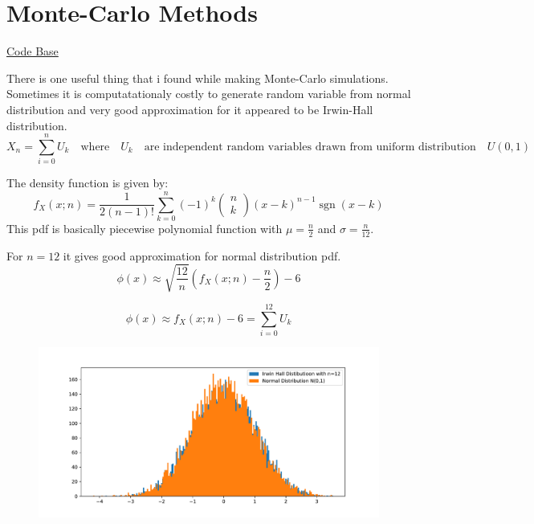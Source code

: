 \chapter{Monte-Carlo Methods}
\href{https://github.com/scaevolabars/monte-carlo}{Code Base}

\begin{heur}
	There is one useful thing that i found while making Monte-Carlo simulations.
	 Sometimes it is computatationaly costly to generate random variable from normal distribution and very good approximation for it
	 appeared to be Irwin-Hall distribution.
	 \begin{equation}
	 	X_n = \sum_{i = 0 }^{n} U_k  \quad \text{where} \quad U_k \quad \text{are independent random variables drawn from  uniform distribution} \quad U(0,1)
	 \end{equation}
 
 	The density function is given by:
 	\begin{equation}
 		f_{X}(x ; n)=\frac{1}{2(n-1) !} \sum_{k=0}^{n}(-1)^{k}\left(\begin{array}{l}
 			n \\
 			k
 		\end{array}\right)(x-k)^{n-1} \operatorname{sgn}(x-k)
 	\end{equation}
 	This pdf is basically piecewise polynomial function with $ \mu = \frac{n}{2}$ and $\sigma = \frac{n}{12}$.
 	
 	For $n = 12$ it gives good approximation for normal distribution pdf.
 	\begin{equation}
 		\phi(x) \approx \sqrt{\frac{12}{n}}(f_X(x;n) - \frac{n}{2}) - 6
 	\end{equation}
 
 	\begin{equation}
 		\phi(x) \approx f_X(x ; n) - 6 = \sum_{i = 0 }^{12} U_k
 	\end{equation}
 
 	\begin{figure}
 		\centering
 		\includegraphics[width=0.8\linewidth]{numerical/figures/irwinhall}
 		\caption{}
 		\label{fig:irwinhall}
 	\end{figure}
 

\end{heur}
